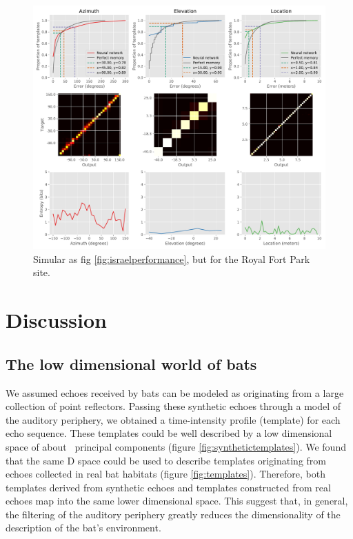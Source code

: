 \documentclass[preprint,5p]{elsarticle}
\begin{document}
\begin{figure}
	\centering
	\includegraphics[width=1\linewidth]{figures/royal_performance}
	\caption{Simular as fig \ref{fig:israelperformance}, but for the Royal Fort Park site.}
	\label{fig:royalperformance}
\end{figure}


\section{Discussion}

\subsection{The low dimensional world of bats}

We assumed echoes received by bats can be modeled as originating from a large collection of point reflectors. Passing these synthetic echoes through a model of the auditory periphery, we obtained a time-intensity profile (template) for each echo sequence. These templates could be well described by a low dimensional space of about \pca\ principal components (figure \ref{fig:synthetictemplates}). We found that the same \pca D space could be used to describe templates originating from echoes collected in real bat habitats (figure \ref{fig:templates}). Therefore, both templates derived from synthetic echoes and templates constructed from real echoes map into the same lower dimensional space. This suggest that, in general, the filtering of the auditory periphery greatly reduces the dimensionality of the description of the bat's environment.
\end{document}
